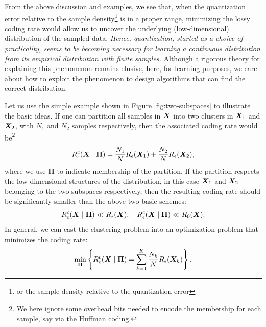 \documentclass[../../book-main.tex]{subfiles}
\begin{document}
From the above discussion and examples, we see that, when the quantization error relative to the sample density\footnote{or the sample density relative to the quantization error} is in a proper range,  minimizing the lossy coding rate would allow us to uncover the underlying (low-dimensional) distribution of the sampled data. {\em Hence, quantization, started as a choice of practicality, seems to be becoming necessary for learning a continuous distribution from its empirical distribution with finite samples.} Although a rigorous theory for explaining this phenomenon remains elusive, here, for learning purposes, we care about how to exploit the phenomenon to design algorithms that can find the correct distribution.

Let us use the simple example shown in Figure \ref{fig:two-subspaces} to illustrate the basic ideas. If one can partition all samples in $\bm{X}$ into two clusters in $\bm{X}_1$ and $\bm{X}_2$, with $N_1$ and $N_2$ samples respectively, then the associated coding rate would be\footnote{We here ignore some overhead bits needed to encode the membership for each sample, say via the Huffman coding.}
\begin{equation}
	R_{\epsilon}^c(\bm{X}\mid \boldsymbol{\Pi}) = \frac{N_1}{N}R_{\epsilon}(\bm{X}_1) + \frac{N_2}{N}R_{\epsilon}(\bm{X}_2),
\end{equation}
where we use $\boldsymbol{\Pi}$ to indicate membership of the partition. If the partition respects the low-dimensional structures of the distribution, in this case $\bm{X}_1$ and $\bm{X}_2$ belonging to the two subspaces respectively, then the resulting coding rate should be significantly smaller than the above two basic schemes:
\begin{equation}
	R_{\epsilon}^c(\bm{X} \mid \boldsymbol{\Pi}) \ll R_{\epsilon}(\bm{X}), \quad     R_{\epsilon}^c(\bm{X} \mid \boldsymbol{\Pi}) \ll R_0(\bm{X}).
\end{equation}
In general, we can cast the clustering problem into an optimization problem that minimizes the coding rate:
\begin{equation}
	\min_{\boldsymbol{\Pi}}  \left\{ R_{\epsilon}^c(\bm{X} \mid \boldsymbol{\Pi}) = \sum_{k=1}^K \frac{N_k}{N}R_{\epsilon}(\bm{X}_k)\right\}.
\end{equation}
\end{document}
